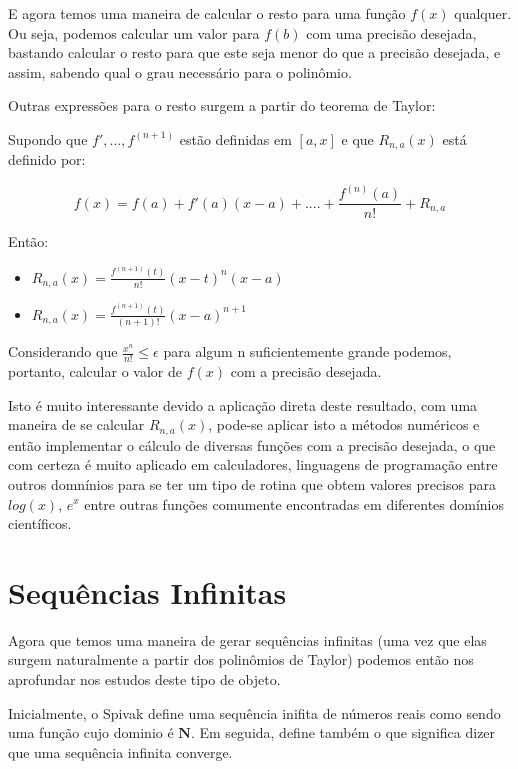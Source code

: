 \documentclass[a4paper, 12pt]{article}
\begin{document}
E agora temos uma maneira de calcular o resto para uma função $f(x)$ qualquer. Ou seja,
podemos calcular um valor para $f(b)$ com uma precisão desejada, bastando calcular o resto para que
este seja menor do que a precisão desejada, e assim, sabendo qual o grau necessário para o
polinômio.

Outras expressões para o resto surgem a partir do teorema de Taylor:

Supondo que $f',...,f^{(n+1)}$ estão definidas em $[a,x]$ e que $R_{n,a}(x)$ está definido por:

\begin{equation}
	\nonumber f(x) = f(a) + f'(a)(x-a) + .... + \frac{f^{(n)}(a)}{n!} + R_{n,a}
\end{equation}

Então:

\begin{itemize}
	\item $R_{n,a}(x) = \frac{f^{(n+1)}(t)}{n!}(x-t)^n (x-a)$
	\item $R_{n,a}(x) = \frac{f^{(n+1)}(t)}{(n + 1)!}(x-a)^{n+1}$
\end{itemize}

Considerando que $\frac{x^n}{n!} \leq \epsilon$ para algum n suficientemente
grande podemos, portanto, calcular o valor de $f(x)$ com a precisão desejada. 

Isto é muito interessante devido a aplicação direta deste resultado, com uma maneira
de se calcular $R_{n,a}(x)$, pode-se aplicar isto a métodos numéricos e então
implementar o cálculo de diversas funções com a precisão desejada, o que com certeza
é muito aplicado em calculadores, linguagens de programação entre outros domnínios
para se ter um tipo de rotina que obtem valores precisos para $log(x)$, $e^x$ entre
outras funções comumente encontradas em diferentes domínios científicos.


\newpage

\section{Sequências Infinitas}

Agora que temos uma maneira de gerar sequências infinitas (uma vez que elas surgem
naturalmente a partir dos polinômios de Taylor) podemos então nos aprofundar nos
estudos deste tipo de objeto.

Inicialmente, o Spivak define uma sequência inifita de números reais como sendo uma função
cujo dominio é $\mathbf{N}$. Em seguida, define também o que significa dizer que uma sequência
infinita converge.
\end{document}
